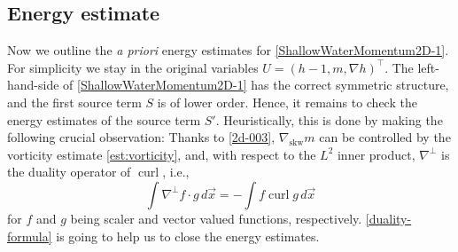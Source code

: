 \documentclass[reqno,11pt]{amsart}
\DeclareMathOperator{\curl}{curl}
\theoremstyle{plain}
\theoremstyle{definition}
\numberwithin{equation}{section}
\begin{document}
\subsection{Energy estimate}
\label{subsec:2d-energy-est}

Now we outline the \emph{a priori} energy estimates for \eqref{ShallowWaterMomentum2D-1}. For simplicity we stay in the original variables $U = (h-1,m,\nabla h)^\top.$ 
The left-hand-side of \eqref{ShallowWaterMomentum2D-1} has the correct symmetric structure, and the first source term $S$ is of lower order. Hence, it remains to check the energy estimates of the source term $S'$. Heuristically, this is done by making the following crucial observation: Thanks to \eqref{2d-003}, $ \nabla_\mathrm{skw} m $ can be controlled by the vorticity estimate \eqref{est:vorticity}, and, with respect to the $ L^2 $ inner product, $ \nabla^\perp $ is the duality operator of $ \curl $, i.e., 
\begin{equation}
\label{duality-formula}
    \int \nabla^\perp f \cdot g \,d\vec x = - \int f \curl g \,d\vec x
\end{equation}
for $ f $ and $ g $ being scaler and vector valued functions, respectively. \eqref{duality-formula} is going to help us to close the energy estimates.
\smallskip
\end{document}
